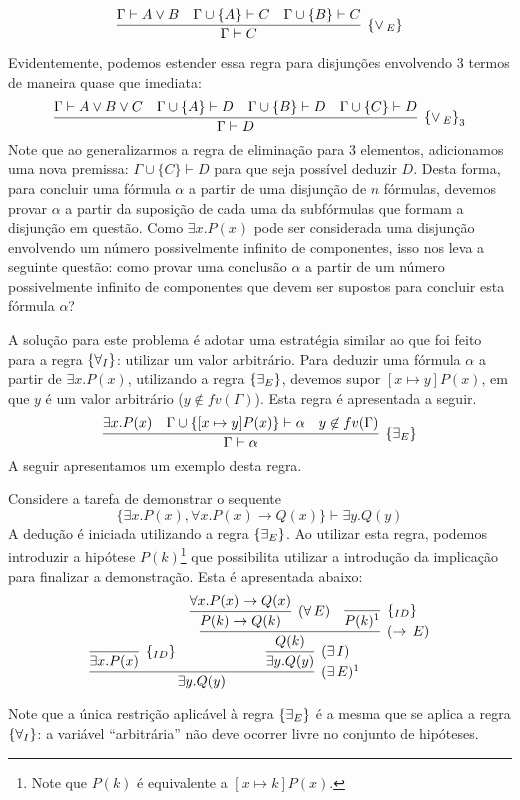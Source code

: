 \[
\infer[\orE]{\Gamma \vdash C}
         {\Gamma \vdash A \lor B & \Gamma \cup \{A\}\vdash C & \Gamma
           \cup \{B\} \vdash C}
\]

Evidentemente, podemos estender essa regra para disjunções envolvendo
$3$ termos de maneira quase que imediata:
\[
\infer[\orE_3]{\Gamma \vdash D}
         {\Gamma \vdash A \lor B \lor C & \Gamma\cup\{A\}\vdash D &
           \Gamma \cup \{B\}\vdash D & \Gamma\cup\{C\}\vdash D}
\]
Note que ao generalizarmos a regra de eliminação para 3 elementos,
adicionamos uma nova premissa: $\Gamma \cup \{C\}\vdash D$ para que
seja possível deduzir $D$. Desta forma, para concluir uma fórmula
$\alpha$ a partir de uma disjunção de $n$ fórmulas, devemos provar
$\alpha$ a partir da suposição de cada uma da subfórmulas que formam a
disjunção em questão. Como $\exists x. P(x)$ pode ser considerada uma
disjunção envolvendo um número possivelmente infinito de componentes,
isso nos leva a seguinte questão: como provar uma conclusão $\alpha$ a
partir de um número possivelmente infinito de componentes que devem
ser supostos para concluir esta fórmula $\alpha$?

A solução para este problema é adotar uma estratégia similar ao que
foi feito para a regra $\scriptsize{\{\forall_I}\}$: utilizar um valor arbitrário. Para
deduzir uma fórmula $\alpha$ a partir de $\exists x. P(x)$, utilizando
a regra $\scriptsize{\{\exists_E}\}$, devemos supor $[x\mapsto y]P(x)$, em que $y$ é um
valor arbitrário ($y\not\in fv(\Gamma)$). Esta regra é apresentada a
seguir.
\[
\infer[\existsE]{\Gamma\vdash\alpha}
        {\exists x. P(x) & \Gamma \cup \{[x\mapsto y] P (x)\}\vdash
          \alpha & y \not\in fv(\Gamma)}
\]
A seguir apresentamos um exemplo desta regra.
\begin{Example}
Considere a tarefa de demonstrar o sequente
\[
\{\exists x. P(x), \forall x. P(x) \to Q(x) \} \vdash \exists y. Q(y)
\]
A dedução é iniciada utilizando a regra $\scriptsize{\{\exists_E}\}$. Ao utilizar esta
regra, podemos introduzir a hipótese $P(k)$\footnote{Note que $P(k)$ é
equivalente a $[x\mapsto k]P(x)$.} que possibilita utilizar a
introdução da implicação para finalizar a demonstração. Esta é
apresentada abaixo:
\[
                     \infer[(\exists\,E)^{1}]
                           {\exists y. Q(y)}
                           {\infer[\Id]{\exists x. P(x)}{} &
                             \infer[(\exists\,I)]
                                   {\exists y. Q(y)}
                                   {
                                     \infer[(\rightarrow\,E)]
                                           {Q(k)}
                                           {
                                             \infer[(\forall\,E)]
                                                   {P(k)\rightarrow Q(k)}
                                                   {\forall x. P(x)\rightarrow Q(x)}
                                             &
                                                   \infer[\Id]{P(k)^1}{}
                                           }
                                   }
                           }
\]
\end{Example}
Note que a única restrição aplicável à regra $\scriptsize{\{\exists_E}\}$ é a mesma que
se aplica a regra $\scriptsize{\{\forall_I}\}$: a variável ``arbitrária'' não deve
ocorrer livre no conjunto de hipóteses.

